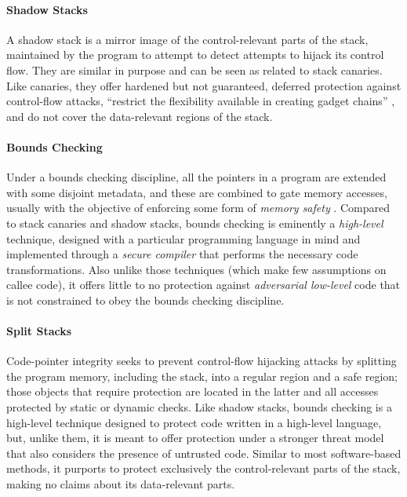 \paragraph{Shadow Stacks}
%
A shadow stack is a mirror image of the control-relevant parts of the stack,
maintained by the program to attempt to detect attempts to hijack its control
flow. They are similar in purpose and can be seen as related to stack canaries.
Like canaries, they offer hardened but not guaranteed, deferred protection
against control-flow attacks, ``restrict the flexibility available in creating
gadget chains'' \cite{Shanbhogue+19}, and do not cover the data-relevant regions
of the stack.
%

\paragraph{Bounds Checking}
%
Under a bounds checking discipline, all the pointers in a program are extended
with some disjoint metadata, and these are combined to gate memory accesses,
usually with the objective of enforcing some form of \emph{memory
safety} .
%
Compared to stack canaries and shadow stacks, bounds checking is eminently
a \emph{high-level} technique, designed with a particular programming language
in mind and implemented through a \emph{secure compiler} \cite{} that performs
the necessary code transformations. Also unlike those techniques (which make few
assumptions on callee code), it offers little to no protection
against \emph{adversarial low-level} code that is not constrained to obey the
bounds checking discipline.
%

\paragraph{Split Stacks}
%
Code-pointer integrity seeks to prevent control-flow hijacking attacks by
splitting the program memory, including the stack, into a regular region and a
safe region; those objects that require protection are located in the latter and
all accesses protected by static or dynamic checks.
%
Like shadow stacks, bounds checking is a high-level technique designed to
protect code written in a high-level language, but, unlike them, it is meant to
offer protection under a stronger threat model that also considers the presence
of untrusted code. Similar to most software-based methods, it purports to
protect exclusively the control-relevant parts of the stack, making no claims
about its data-relevant parts.

